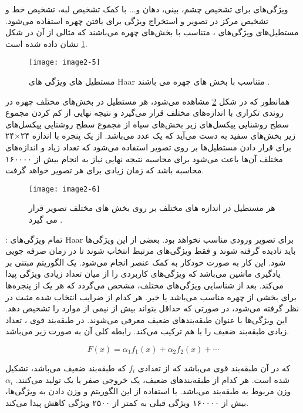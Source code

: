 \noindent
ویژگی‌های‌  برای تشخیص چشم، بینی، دهان و... با کمک تشخیص لبه، تشخیص خط و تشخیص مرکز در تصویر و استخراج ویژگی برای یافتن چهره استفاده می‌شود. مستطیل‌های ویژگی‌های ، متناسب با بخش‌های چهره می‌باشند که مثالی از آن در شکل \ref{image2-5} نشان داده شده است.

\begin{figure}
	\centering
	\texttt{[image: image2-5]}
	\caption{مستطیل های ویژگی های Haar متناسب با بخش های چهره می باشند \cite{990517}.}
	\label{image2-5}
\end{figure}

\noindent
همانطور که در شکل \ref{image2-6} مشاهده می‌شود، هر مستطیل در بخش‌های مختلف چهره در روندی تکراری با اندازه‌های مختلف قرار می‌گیرد و نتیجه نهایی از کم کردن مجموع سطح روشنایی پیکسل‌های زیر بخش‌های سیاه از مجموع سطح روشنایی پیکسل‌های زیر بخش‌های سفید به دست می‌آید که یک عدد می‌باشد. از یک پنجره با اندازه ۲۴×۲۴ برای قرار دادن مستطیل‌ها بر روی تصویر استفاده می‌شود که تعداد زیاد و اندازه‌های مختلف آن‌ها باعث می‌شود برای محاسبه نتیجه نهایی نیاز به انجام بیش از ۱۶۰۰۰۰ محاسبه باشد که زمان زیادی برای هر تصویر خواهد گرفت.

\begin{figure}[h]
\centering
  \texttt{[image: image2-6]}
  \caption{هر مستطیل در اندازه های مختلف بر روی بخش های مختلف تصویر قرار می گیرد \cite{990517}.}
  \label{image2-6}
\end{figure}

\noindent
{}: 
تمام ویژگی‌های Haar برای تصویر ورودی مناسب نخواهد بود. بعضی از این ویژگی‌ها باید نادیده گرفته شوند و فقط ویژگی‌های مرتبط انتخاب شوند تا در زمان صرفه جویی شود. این کار به صورت خودکار به کمک عنصر  انجام می‌شود.  یک الگوریتم مبتنی بر یادگیری ماشین می‌باشد که ویژگی‌های کاربردی را از میان تعداد زیادی ویژگی پیدا می‌کند. بعد از شناسایی ویژگی‌های مختلف، مشخص می‌گردد که هر یک از پنجره‌ها برای بخشی از چهره مناسب می‌باشد یا خیر. هر کدام از ضرایب انتخاب شده مثبت در نظر گرفته می‌شود، در صورتی که حداقل بتواند بیش از نیمی از موارد را تشخیص دهد. این ویژگی‌ها با عنوان طبقه‌بندهای ضعیف  معرفی می‌شوند.   در طبقه‌بند قوی ، تعداد زيادی طبقه‌بند ضعيف را با هم ترکيب مي‌کند. رابطه کلی آن به صورت زیر می‌باشد.

\begin{equation}\label{eq2-5}
F(x)=\alpha_1 f_1 (x) + \alpha_2 f_2 (x) + \cdots
\end{equation}

\noindent
که در آن  طبقه‌بند قوی می‌باشد که از تعدادی $f_i$ که طبقه‌بند ضعیف می‌باشد، تشکیل شده است. هر کدام از طبقه‌بندهای ضعیف، یک خروجی صفر یا یک تولید می‌کنند. $\alpha_i$ وزن مربوط به طبقه‌بند می‌باشد. با استفاده از این الگوریتم و وزن دادن به ویژگی‌ها، بیش از ۱۶۰۰۰۰ ویژگی قبلی به کمتر از ۲۵۰۰ ویژگی کاهش پیدا می‌کند.

